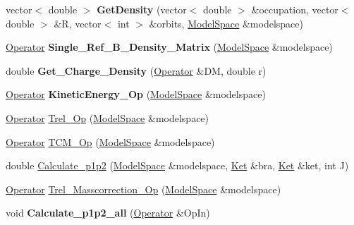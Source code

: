 \begin{DoxyCompactItemize}
\item 
\mbox{\label{namespaceimsrg__util_a0861308a124f4d069d06d43282bfe3c5}} 
vector$<$ double $>$ {\bfseries Get\+Density} (vector$<$ double $>$ \&occupation, vector$<$ double $>$ \&R, vector$<$ int $>$ \&orbits, \hyperlink{classModelSpace}{Model\+Space} \&modelspace)
\item 
\mbox{\label{namespaceimsrg__util_a4bf9faf889c6a1dc250e5628db3a9a95}} 
\hyperlink{classOperator}{Operator} {\bfseries Single\+\_\+\+Ref\+\_\+B\+\_\+\+Density\+\_\+\+Matrix} (\hyperlink{classModelSpace}{Model\+Space} \&modelspace)
\item 
\mbox{\label{namespaceimsrg__util_a204a25658a656ba34205f79cd953fa86}} 
double {\bfseries Get\+\_\+\+Charge\+\_\+\+Density} (\hyperlink{classOperator}{Operator} \&DM, double r)
\item 
\mbox{\label{namespaceimsrg__util_a8307ba0c5338ac3834923f5c12a5d6e2}} 
\hyperlink{classOperator}{Operator} {\bfseries Kinetic\+Energy\+\_\+\+Op} (\hyperlink{classModelSpace}{Model\+Space} \&modelspace)
\item 
\hyperlink{classOperator}{Operator} \hyperlink{namespaceimsrg__util_ac417628e699933643474e0f48d9646c7}{Trel\+\_\+\+Op} (\hyperlink{classModelSpace}{Model\+Space} \&modelspace)
\item 
\hyperlink{classOperator}{Operator} \hyperlink{namespaceimsrg__util_a9b3d4919bee84bfc3887cddb802ea643}{T\+C\+M\+\_\+\+Op} (\hyperlink{classModelSpace}{Model\+Space} \&modelspace)
\item 
double \hyperlink{namespaceimsrg__util_a3aad21447b8e28d22597a79220ba805a}{Calculate\+\_\+p1p2} (\hyperlink{classModelSpace}{Model\+Space} \&modelspace, \hyperlink{classKet}{Ket} \&bra, \hyperlink{classKet}{Ket} \&ket, int J)
\item 
\hyperlink{classOperator}{Operator} \hyperlink{namespaceimsrg__util_ad98bde55827adc03ecbca03925e3f65a}{Trel\+\_\+\+Masscorrection\+\_\+\+Op} (\hyperlink{classModelSpace}{Model\+Space} \&modelspace)
\item 
\mbox{\label{namespaceimsrg__util_a0ec2261db485bb5eb10b95cf6710daa6}} 
void {\bfseries Calculate\+\_\+p1p2\+\_\+all} (\hyperlink{classOperator}{Operator} \&Op\+In)
\item 

\end{DoxyCompactItemize}
